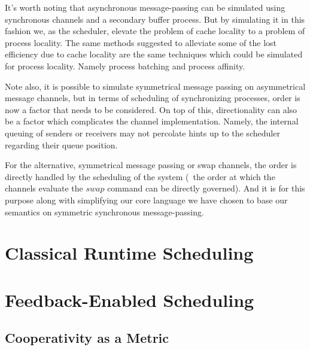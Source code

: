 It's worth noting that asynchronous message-passing can be simulated using 
synchronous channels and a secondary buffer process. But by simulating it in 
this fashion we, as the scheduler, elevate the problem of cache locality to a
problem of process locality. The same methods suggested to alleviate some of the 
lost efficiency due to cache locality \cite{markatos1991load,markatos1991memory}
are the same techniques which could be simulated for process locality. Namely
process batching and process affinity.

Note also, it is possible to simulate symmetrical message passing on asymmetrical 
message channels, but in terms of scheduling of synchronizing processes, order 
is now a factor that needs to be considered. On top of this, directionality can 
also be a factor which complicates the channel implementation. Namely, the 
internal queuing of senders or receivers may not percolate hints up to the 
scheduler regarding their queue position. 

For the alternative, symmetrical message passing or swap channels, the order is 
directly handled by the scheduling of the system (\ie~the order at which the 
channels evaluate the $swap$ command can be directly governed). And it is for 
this purpose along with simplifying our core language we have chosen to base our
semantics on symmetric synchronous message-passing. 

\section{Classical Runtime Scheduling}


\section{Feedback-Enabled Scheduling}


\subsection{Cooperativity as a Metric}



